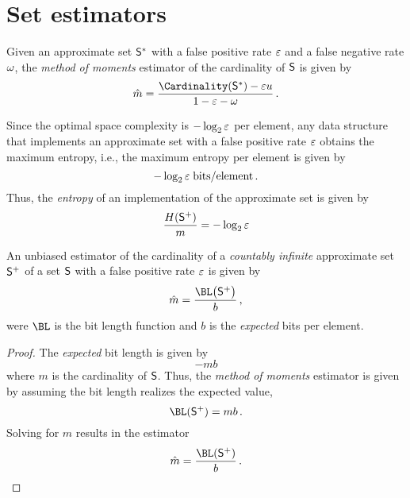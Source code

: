 \documentclass[ ../main.tex]{subfiles}
\begin{document}
\section{Set estimators}
\label{sec:estimators}

Given an approximate set $\ASet{S}$ with a false positive rate $\fprate$ and a false negative rate $\fnrate$, the \emph{method of moments} estimator of the cardinality of $\Set{S}$ is given by
\begin{equation}
\label{eq:exp_St_finite}
    \hat{m} = \frac{\Cardinality\!\left(\ASet{S}\right) - \fprate u}{1 - \fprate - \fnrate}\,.
\end{equation}


Since the optimal space complexity is $-\log_2 \fprate$ per element, any data structure that implements an approximate set with a false positive rate $\fprate$ obtains the maximum entropy, i.e., the maximum entropy per element is given by
\begin{equation}
    -\log_2 \fprate \; \si{bits \per element}\,.
\end{equation}
Thus, the \emph{entropy} of an implementation of the approximate set is given by
\begin{equation}
    \frac{H(\PASet{S})}{m} = -\log_2 \fprate
\end{equation}




\begin{theorem}
An unbiased estimator of the cardinality of a \emph{countably infinite} approximate set $\PASet{S}$ of a set $\Set{S}$ with a false positive rate $\fprate$ is given by
\begin{equation}
    \hat{m} = \frac{\BL\!\left(\PASet{S}\right)}{b}\,,
\end{equation}
were $\BL$ is the bit length function and $b$ is the \emph{expected} bits per element.
\end{theorem}
\begin{proof}
The \emph{expected} bit length is given by
\begin{equation*}
    -m b
\end{equation*}
where $m$ is the cardinality of $\Set{S}$. Thus, the \emph{method of moments} estimator is given by assuming the bit length realizes the expected value,
\begin{equation}
    \BL(\PASet{S}) = m b\,.
\end{equation}
Solving for $m$ results in the estimator
\begin{equation}
    \hat{m} = \frac{\BL(\PASet{S})}{b}\,.
\end{equation}
\end{proof}
\end{document}
